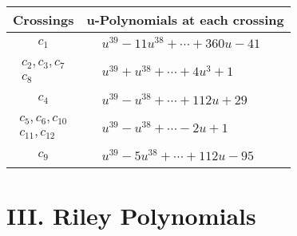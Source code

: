 \documentclass[1p]{elsarticle_modified}
\theoremstyle{definition}
\begin{document}
\begin{tabular}{m{50pt}|m{274pt}}
Crossings & \hspace{64pt}u-Polynomials at each crossing \\
\hline $$\begin{aligned}c_{1}\end{aligned}$$&$\begin{aligned}
&u^{39}-11 u^{38}+\cdots+360 u-41
\end{aligned}$\\
\hline $$\begin{aligned}c_{2},c_{3},c_{7}\\c_{8}\end{aligned}$$&$\begin{aligned}
&u^{39}+u^{38}+\cdots+4 u^3+1
\end{aligned}$\\
\hline $$\begin{aligned}c_{4}\end{aligned}$$&$\begin{aligned}
&u^{39}- u^{38}+\cdots+112 u+29
\end{aligned}$\\
\hline $$\begin{aligned}c_{5},c_{6},c_{10}\\c_{11},c_{12}\end{aligned}$$&$\begin{aligned}
&u^{39}- u^{38}+\cdots-2 u+1
\end{aligned}$\\
\hline $$\begin{aligned}c_{9}\end{aligned}$$&$\begin{aligned}
&u^{39}-5 u^{38}+\cdots+112 u-95
\end{aligned}$\\
\hline
\end{tabular}\newpage\renewcommand{\arraystretch}{1}
\centering \section*{ III. Riley Polynomials}
\end{document}
